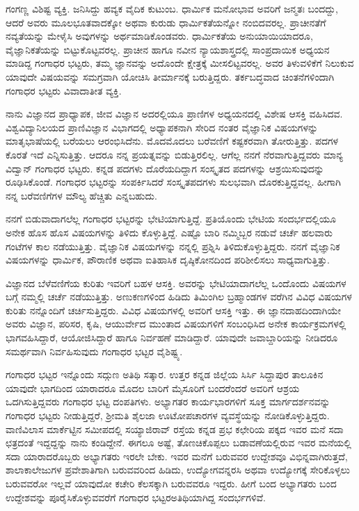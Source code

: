 {ಗಂಗಣ್ಣ ವಿಶಿಷ್ಟ ವ್ಯಕ್ತಿ.  ಜನಿಸಿದ್ದು ಹವ್ಯಕ ವೈದಿಕ ಕುಟುಂಬ.  ಧಾರ್ಮಿಕ ಮನೋಭಾವ ಅವರಿಗೆ ಜನ್ಮತಃ ಬಂದದ್ದು, ಆದರೆ ಅವರು ಮೂಲಭೂತವಾದಕ್ಕೋ ಅಥವಾ ಕುರುಡು ಧಾರ್ಮಿಕತೆಯನ್ನೋ ನಂಬಿದವರಲ್ಲ.  ಪ್ರಾಚೀನತೆಗೆ ನವ್ಯತೆಯನ್ನು ಮೇಳೈಸಿ ಅವುಗಳನ್ನು ಅರ್ಥಮಾಡಿಕೊಂಡವರು.  ಧಾರ್ಮಿಕತೆಯ ಅನುಯಾಯಿಯಾದರೂ, ವೈಜ್ಞಾನಿಕತೆಯನ್ನು ಬಿಟ್ಟುಕೊಟ್ಟವರಲ್ಲ.  ಪ್ರಾಚೀನ ಹಾಗೂ ನವೀನ ನ್ಯಾಯಶಾಸ್ತ್ರದಲ್ಲಿ ಸಾಂಪ್ರದಾಯಿಕ ಅಧ್ಯಯನ ಮಾಡಿದ್ದ ಗಂಗಾಧರ ಭಟ್ಟರು,  ತಮ್ಮ ಜ್ಞಾನವನ್ನು ಅದೊಂದೇ ಕ್ಷೇತ್ರಕ್ಕೆ ಮೀಸಲಿಟ್ಟವರಲ್ಲ.  ಅವರ ತಿಳುವಳಿಕೆಗೆ ನಿಲುಕುವ ಯಾವುದೇ ವಿಷಯ\-ವನ್ನು ಸಮಗ್ರವಾಗಿ ಯೋಚಿಸಿ ತೀರ್ಮಾನಕ್ಕೆ ಬರುತ್ತಿದ್ದರು.  ತರ್ಕಬದ್ಧವಾದ ಚಿಂತನೆಗಳಿಂದಾಗಿ  ಗಂಗಾಧರ ಭಟ್ಟರು ವಿವಾದಾತೀತ ವ್ಯಕ್ತಿ.    

ನಾನು ವಿಜ್ಞಾನದ ಪ್ರಾಧ್ಯಾಪಕ, ಜೀವ ವಿಜ್ಞಾನ ಅದರಲ್ಲಿಯೂ ಪ್ರಾಣಿಗಳ ಅಧ್ಯಯನದಲ್ಲಿ ವಿಶೇಷ ಆಸಕ್ತಿ ವಹಿಸಿದವ.  ವಿಶ್ವವಿದ್ಯಾನಿಲಯದ ಪ್ರಾಣಿವಿಜ್ಞಾನ ವಿಭಾಗದಲ್ಲಿ ಅಧ್ಯಾಪಕನಾಗಿ ಸೇರಿದ ನಂತರ ವೈಜ್ಞಾನಿಕ ವಿಷಯಗಳನ್ನು ಮಾತೃಭಾಷೆಯಲ್ಲಿ ಬರೆಯಲು ಆರಂಭಿಸಿದೆನು.  ಮೊದಮೊದಲು ಬರೆವಣಿಗೆ ಕಷ್ಟಕರವಾಗಿ ತೋರುತ್ತಿತ್ತು.  ಪದಗಳ ಕೊರತೆ ಇದೆ ಎನ್ನಿಸುತ್ತಿತ್ತು.  ಆದರೂ ನನ್ನ ಪ್ರಯತ್ನವನ್ನು ಬಿಡುತ್ತಿರಲಿಲ್ಲ.  ಆಗೆಲ್ಲ ನನಗೆ ನೆರವಾಗುತ್ತಿದ್ದವರು ಮಾನ್ಯ ವಿದ್ವಾನ್ ಗಂಗಾಧರ ಭಟ್ಟರು. ಕನ್ನಡ ಪದಗಳು ದೊರೆಯದಿದ್ದಾಗ ಸಂಸ್ಕೃತದ ಪದಗಳನ್ನು ಆಶ್ರಯಿಸುವುದನ್ನು ರೂಢಿಸಿಕೊಂಡೆ.  ಗಂಗಾಧರ ಭಟ್ಟರನ್ನು ಸಂಪರ್ಕಿಸಿದರೆ ಸಂಸ್ಕೃತಪದಗಳು ಸುಲಭವಾಗಿ ದೊರಕುತ್ತಿದ್ದವಲ್ಲ.  ಹೀಗಾಗಿ ನನ್ನ ಬರೆವಣಿಗೆಗಳ ಮೌಲ್ಯ ಹೆಚ್ಚಿತು ಎನ್ನಬಹುದು.  

ನನಗೆ ಬಿಡುವಾದಾಗಲೆಲ್ಲ ಗಂಗಾಧರ ಭಟ್ಟರನ್ನು ಭೇಟಿಯಾಗುತ್ತಿದ್ದೆ.  ಪ್ರತಿಯೊಂದು ಭೇಟಿಯ ಸಂದರ್ಭದಲ್ಲಿಯೂ ಅನೇಕ ಹೊಸ ಹೊಸ ವಿಷಯಗಳನ್ನು ತಿಳಿದು ಕೊಳ್ಳುತ್ತಿದ್ದೆ.  ಎಷ್ಟೊ ಬಾರಿ ನಮ್ಮಿಬ್ಬರ ನಡುವೆ ಚರ್ಚೆ ಹಲವಾರು ಗಂಟೆಗಳ ಕಾಲ ನಡೆಯುತ್ತಿತ್ತು.  ವೈಜ್ಞಾನಿಕ ವಿಷಯಗಳನ್ನು ನನ್ನಲ್ಲಿ ಪ್ರಶ್ನಿಸಿ ತಿಳಿದುಕೊಳ್ಳುತ್ತಿದ್ದರು.  ನನಗೆ ವೈಜ್ಞಾನಿಕ ವಿಷಯಗಳನ್ನು ಧಾರ್ಮಿಕ, ಪೌರಾಣಿಕ ಅಥವಾ ಐತಿಹಾಸಿಕ ದೃಷ್ಠಿಕೋನದಿಂದ ಪರಿಶೀಲಿ\-ಸಲು ಸಾಧ್ಯವಾಗುತ್ತಿತ್ತು.   
\vskip 4pt

ವಿಜ್ಞಾನದ ಬೆಳೆವಣಿಗೆಯ ಕುರಿತು ಇವರಿಗೆ ಬಹಳ ಆಸಕ್ತಿ. ಅವರನ್ನು ಭೇಟಿಯಾದಾಗಲೆಲ್ಲ  ಒಂದೊಂದು ವಿಷಯಗಳ ಬಗ್ಗೆ ನಮ್ಮಲ್ಲಿ ಚರ್ಚೆ ನಡೆಯುತ್ತಿತ್ತು.  ಅಣು\enginline{-}ಕಣಗಳಿಂದ ಹಿಡಿದು ತಿಮಿಂಗಿಲ ಬ್ರಹ್ಮಾಂಡಗಳ ವರೆಗಿನ ವಿವಿಧ ವಿಷಯಗಳ ಕುರಿತು ನನ್ನೊಂದಿಗೆ ಚರ್ಚಿಸುತ್ತಿದ್ದರು.  ವಿವಿಧ ವಿಷಯಗಳಲ್ಲಿ ಅವರಿಗೆ ಆಸಕ್ತಿ ಇತ್ತು.  ಈ ಜ್ಞಾನದಾಹದಿಂದಾಗಿಯೇ ಅವರು ವಿಜ್ಞಾನ, ಪರಿಸರ, ಕೃಷಿ, ಆಯುರ್ವೇದ ಮುಂತಾದ ವಿಷಯ\-ಗಳಿಗೆ ಸಂಬಂಧಿಸಿದ ಅನೇಕ ಕಾರ್ಯಕ್ರಮಗಳಲ್ಲಿ ಭಾಗವಹಿಸಿದ್ದಾರೆ, ಆಯೋಜಿ\-ಸಿದ್ದಾರೆ ಹಾಗೂ ನಿರ್ವಹಣೆ ಮಾಡಿದ್ದಾರೆ.  ಯಾವುದೇ ಜವಾಬ್ದಾರಿಯನ್ನು ನೀಡಿದರೂ ಸಮರ್ಥವಾಗಿ ನಿರ್ವಹಿಸುವುದು ಗಂಗಾಧರ ಭಟ್ಟರ ವೈಶಿಷ್ಟ್ಯ. 
\vskip 4pt

ಗಂಗಾಧರ ಭಟ್ಟರ ಇನ್ನೊಂದು ಸದ್ಗುಣ ಅತಿಥಿ ಸತ್ಕಾರ.  ಉತ್ತರ ಕನ್ನಡ ಜಿಲ್ಲೆಯ ಸಿರ್ಸಿ ಸಿದ್ದಾಪುರ ತಾಲೂಕಿನ ಯಾವುದೇ ಭಾಗದಿಂದ ಯಾರಾದರೂ ಮೊದಲ ಬಾರಿಗೆ ಮೈಸೂರಿಗೆ ಬಂದರೆಂದರೆ ಅವರಿಗೆ ಆಶ್ರಯ ಒದಗಿಸುತ್ತಿದ್ದವರು ಗಂಗಾಧರ ಭಟ್ಟ ದಂಪತಿಗಳು.  ಅಭ್ಯಾಗತರ ಕಾರ್ಯಭಾರಗಳಿಗೆ ಸೂಕ್ತ ಮಾರ್ಗದರ್ಶನವನ್ನು ಗಂಗಾಧರ ಭಟ್ಟರು ನೀಡುತ್ತಿದ್ದರೆ, ಶ್ರೀಮತಿ ಶೈಲಜಾ ಊಟೋಪಚಾರಗಳ ವ್ಯವಸ್ಥೆಯನ್ನು ನೋಡಿಕೊಳ್ಳುತ್ತಿದ್ದರು.  ವಾಣಿವಿಲಾಸ ಮಾರ್ಕೆಟ್ಟಿನ ಸಮೀಪದಲ್ಲಿ ಸಯ್ಯಾಜಿರಾವ್ ರಸ್ತೆಯ ಕನ್ನಡ ಪ್ರಭ ಕಛೇರಿಯ ಪಕ್ಕದ ಇವರ ಮನೆ ಸದಾ ಛತ್ರದಂತೆ ಇದ್ದದ್ದನ್ನು ನಾನು ಕಂಡಿದ್ದೇನೆ.  ಈಗಲೂ ಅಷ್ಟೆ, ತೊಣಚಿಕೊಪ್ಪಲು ಬಡಾವಣೆಯಲ್ಲಿರುವ ಇವರ ಮನೆಯಲ್ಲಿ ಸದಾ ಯಾರಾದರೊಬ್ಬರು ಅಭ್ಯಾಗತರು ಇರಲೇ ಬೇಕು.  ಇವರ ಮನೆಗೆ ಬರುವವರ ಉದ್ದೇಶವೂ ವಿಭಿನ್ನವಾಗಿರುತ್ತದೆ, ಶಾಲಾ\enginline{-}ಕಾಲೇಜುಗಳ ಪ್ರವೇಶಾತಿಗಾಗಿ ಬರುವವರಿಂದ ಹಿಡಿದು, ಉದ್ಯೋಗವನ್ನರಸಿ ಅಥವಾ ಉದ್ಯೋಗಕ್ಕೆ ಸೇರಿಕೊಳ್ಳಲು ಬರುವವರೋ ಇಲ್ಲವೆ ಯಾವುದೋ ಕಚೇರಿ ಕೆಲಸಕ್ಕಾಗಿ ಬರುವವರೂ ಇದ್ದರು.  ಹೀಗೆ ಬಂದ ಅಭ್ಯಾಗತರು ಬಂದ ಉದ್ದೇಶವನ್ನು ಪೂರೈಸಿಕೊಳ್ಳುವವರೆಗೆ ಗಂಗಾಧರ ಭಟ್ಟರ\break ಅತಿಥಿಯಾಗಿದ್ದ ಸಂದರ್ಭಗಳಿವೆ.         

}
